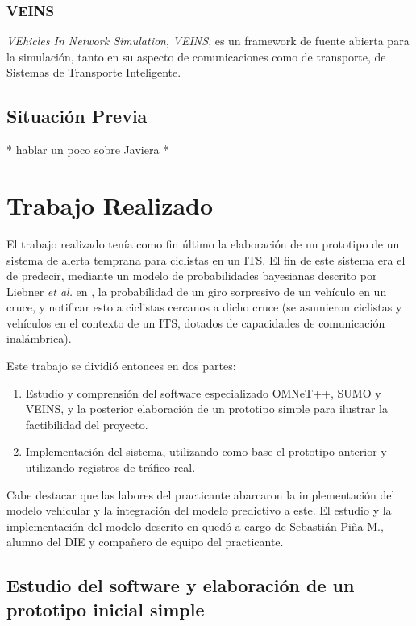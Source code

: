 \documentclass[11pt,letterpaper]{article}
\begin{document}
\subsubsection{VEINS}

\emph{VEhicles In Network Simulation}, \emph{VEINS}, es un framework de fuente abierta para la simulación, tanto en su aspecto de comunicaciones como de transporte, de Sistemas de Transporte Inteligente.


\subsection{Situación Previa}\label{section:situacion_previa}

* hablar un poco sobre Javiera *

\newpage
\section{Trabajo Realizado}

El trabajo realizado tenía como fin último la elaboración de un prototipo de un sistema de alerta temprana para ciclistas en un ITS. El fin de este sistema era el de predecir, mediante un modelo de probabilidades bayesianas descrito por Liebner \textit{et al.} en \cite{prediction-paper}, la probabilidad de un giro sorpresivo de un vehículo en un cruce, y notificar esto a ciclistas cercanos a dicho cruce (se asumieron ciclistas y vehículos en el contexto de un ITS, dotados de capacidades de comunicación inalámbrica).

Este trabajo se dividió entonces en dos partes:

\begin{enumerate}
  \item Estudio y comprensión del software especializado OMNeT++, SUMO y VEINS, y la posterior elaboración de un prototipo simple para ilustrar la factibilidad del proyecto.
  \item Implementación del sistema, utilizando como base el prototipo anterior y utilizando registros de tráfico real.
\end{enumerate}

Cabe destacar que las labores del practicante abarcaron la implementación del modelo vehicular y la integración del modelo predictivo a este. El estudio y la implementación del modelo descrito en \cite{prediction-paper} quedó a cargo de Sebastián Piña M., alumno del DIE y compañero de equipo del practicante.

\subsection{Estudio del software y elaboración de un prototipo inicial simple}
\end{document}
